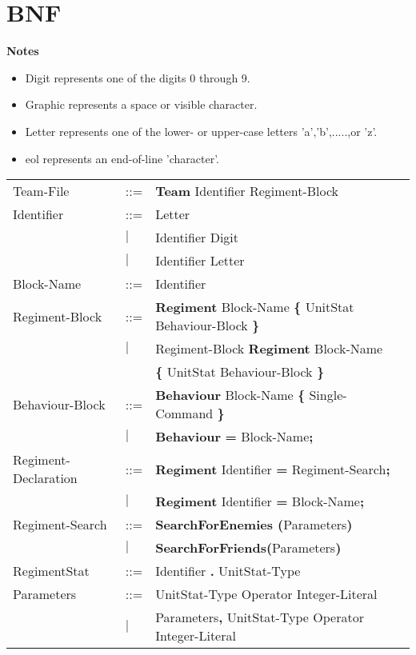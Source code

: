 \appendix
\chapter{BNF}
\label{app:bnf}
{\bf Notes}
\begin{itemize}
	\item Digit represents one of the digits 0 through 9.
	\item Graphic represents a space or visible character.
	\item Letter represents one of the lower- or upper-case letters 'a','b',.....,or 'z'.
	\item eol represents an end-of-line 'character'.
\end{itemize}
\begin{center}
		\begin{longtable}{l l p{7cm}}
		\endfirsthead
		\endhead
Team-File					&	::=	&{\bf Team} Identifier Regiment-Block\\
Identifier					&	::=	&Letter\\
							&$\mid$	&Identifier Digit\\
							&$\mid$	&Identifier Letter\\
Block-Name					&	::=	&Identifier\\
Regiment-Block				&	::=	&{\bf Regiment} Block-Name {\bf \{ } UnitStat Behaviour-Block \bf{\} }\\
							&$\mid$	&Regiment-Block {\bf Regiment} Block-Name\\
							&		&{\bf \{ } UnitStat Behaviour-Block \bf{\} }\\
Behaviour-Block				&	::=	&{\bf Behaviour} Block-Name {\bf \{} Single-Command {\bf \}}  \\
							&$\mid$	& {\bf Behaviour} {\bf = } Block-Name{\bf ;} \\
Regiment-Declaration			&	::=	&{\bf Regiment} Identifier {\bf =} Regiment-Search{\bf ;}\\
							&$\mid$	&{\bf Regiment} Identifier {\bf =} Block-Name{\bf ;}\\
Regiment-Search				&	::=	&{\bf SearchForEnemies (}Parameters{\bf)}\\
							&$\mid$	&{\bf SearchForFriends(}Parameters{\bf)}\\
RegimentStat				&	::=	&Identifier {\bf.} UnitStat-Type \\
Parameters					&	::=	&UnitStat-Type Operator Integer-Literal\\
 							&$\mid$	&Parameters{\bf ,} UnitStat-Type Operator Integer-Literal\\

\end{longtable}
\end{center}
